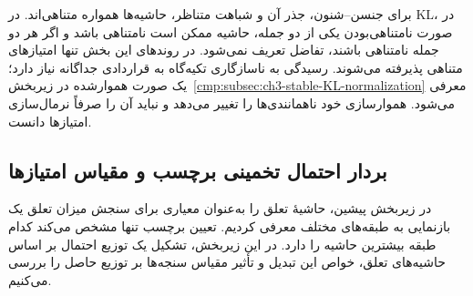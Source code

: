 برای جنسن--شنون، جذر آن و شباهت متناظر، حاشیه‌ها
همواره متناهی‌اند. در KL، در صورت نامتناهی‌بودن یکی از
دو جمله، حاشیه ممکن است نامتناهی باشد و اگر هر دو جمله
نامتناهی باشند، تفاضل تعریف نمی‌شود. در روندهای این بخش
تنها امتیازهای متناهی پذیرفته می‌شوند.
رسیدگی به ناسازگاری تکیه‌گاه به قراردادی جداگانه
نیاز دارد؛ یک صورت هموارشده در
زیربخش~\ref{cmp:subsec:ch3-stable-KL-normalization}
معرفی می‌شود. هموارسازی خود ناهمانندی‌ها را تغییر
می‌دهد و نباید آن را صرفاً نرمال‌سازی امتیازها دانست.

\subsection{بردار احتمال تخمینی برچسب و مقیاس امتیازها}
\label{cmp:subsec:ch3-label-probability-vector}
در زیربخش پیشین، حاشیهٔ تعلق را به‌عنوان معیاری برای
سنجش میزان تعلق یک بازنمایی به طبقه‌های مختلف معرفی
کردیم. تعیین برچسب تنها مشخص می‌کند کدام طبقه بیشترین
حاشیه را دارد. در این زیربخش، تشکیل یک توزیع احتمال
بر اساس حاشیه‌های تعلق، خواص این تبدیل و تأثیر مقیاس
سنجه‌ها بر توزیع حاصل را بررسی می‌کنیم.

